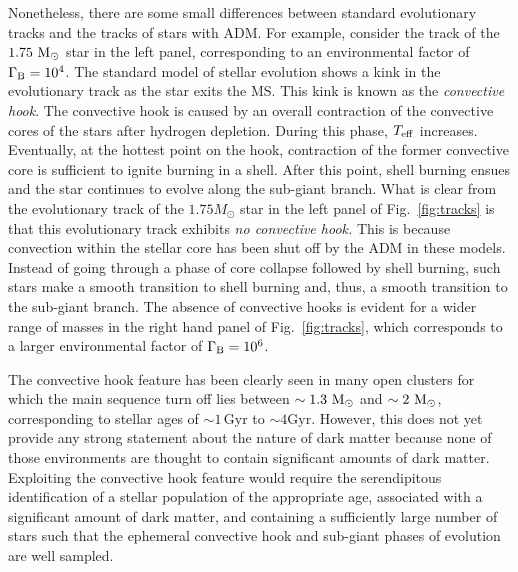 \documentclass[useAMS,usenatbib]{mnras}
\begin{document}
Nonetheless, there are some small differences between 
standard evolutionary tracks and the tracks of stars 
with ADM. For example, consider the track of the 
$1.75 \ \mathrm{M}_{\odot}$ star in the left panel, corresponding 
to an environmental factor of $\Gamma_\mathrm{B} = 10^4$.
The standard 
model of stellar evolution shows a kink in the evolutionary 
track as the star exits the MS. This kink is known as the 
{\em convective hook}. The convective hook is caused by 
an overall contraction of the convective cores of the 
stars after hydrogen depletion. During this phase, 
$T_{\rm eff}$ increases. Eventually, at the hottest point 
on the hook, contraction of the former convective core 
is sufficient to ignite burning in a shell. After this 
point, shell burning ensues and the star continues to 
evolve along the sub-giant branch. What is clear from 
the evolutionary track of the $1.75M_{\odot}$ star 
in the left panel of Fig.~\ref{fig:tracks} is that 
this evolutionary track exhibits {\em no convective hook.} 
This is because convection within the stellar core has 
been shut off by the ADM in these models. Instead of 
going through a phase of core collapse followed by shell 
burning, such stars make a smooth transition to shell burning 
and, thus, a smooth transition to the sub-giant branch. 
The absence of convective hooks is evident 
for a wider range of masses in the right hand 
panel of Fig.~\ref{fig:tracks}, which corresponds 
to a larger environmental factor of $\Gamma_\mathrm{B}=10^6$. 


The convective hook feature has been clearly 
seen in many open clusters for which 
the main sequence turn off lies between $\sim 1.3\ \mathrm{M}_{\odot}$ 
and $\sim 2\ \mathrm{M}_{\odot}$, corresponding to stellar 
ages of $\sim 1\, \mathrm{Gyr}$ to $\sim 4\mathrm{Gyr}$. 
However, this does not yet provide any strong 
statement about the nature of dark matter because 
none of those environments are thought to contain 
significant amounts of dark matter. 
Exploiting the convective hook feature 
would require the serendipitous identification 
of a stellar population of the appropriate age, associated with a significant amount of dark matter, and containing a sufficiently
large number of stars such that the ephemeral 
convective hook and sub-giant phases of 
evolution are well sampled.
\end{document}
